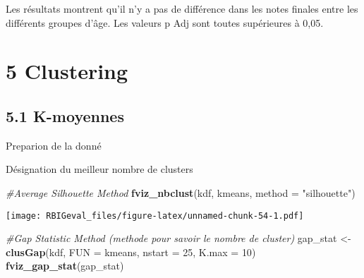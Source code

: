 \documentclass[
]{article}
\newenvironment{Shaded}{\begin{snugshade}}{\end{snugshade}}
\newcommand{\CommentTok}[1]{\textcolor[rgb]{0.56,0.35,0.01}{\textit{#1}}}
\newcommand{\DataTypeTok}[1]{\textcolor[rgb]{0.13,0.29,0.53}{#1}}
\newcommand{\DecValTok}[1]{\textcolor[rgb]{0.00,0.00,0.81}{#1}}
\newcommand{\KeywordTok}[1]{\textcolor[rgb]{0.13,0.29,0.53}{\textbf{#1}}}
\newcommand{\NormalTok}[1]{#1}
\newcommand{\OperatorTok}[1]{\textcolor[rgb]{0.81,0.36,0.00}{\textbf{#1}}}
\newcommand{\StringTok}[1]{\textcolor[rgb]{0.31,0.60,0.02}{#1}}
\begin{document}
Les résultats montrent qu'il n'y a pas de différence dans les notes
finales entre les différents groupes d'âge. Les valeurs p Adj sont
toutes supérieures à 0,05.

\hypertarget{clustering}{%
\section{5 Clustering}\label{clustering}}

\hypertarget{k-moyennes}{%
\subsection{5.1 K-moyennes}\label{k-moyennes}}

Preparion de la donné

\begin{Shaded}
\end{Shaded}

Désignation du meilleur nombre de clusters

\begin{Shaded}
\begin{Highlighting}[]
\CommentTok{#Average Silhouette Method}
\KeywordTok{fviz_nbclust}\NormalTok{(kdf, kmeans, }\DataTypeTok{method =} \StringTok{"silhouette"}\NormalTok{)}
\end{Highlighting}
\end{Shaded}

\texttt{[image: RBIGeval\_files/figure-latex/unnamed-chunk-54-1.pdf]}

\begin{Shaded}
\begin{Highlighting}[]
\CommentTok{#Gap Statistic Method (methode pour savoir le nombre de cluster)}
\NormalTok{gap_stat <-}\StringTok{ }\KeywordTok{clusGap}\NormalTok{(kdf, }\DataTypeTok{FUN =}\NormalTok{ kmeans, }\DataTypeTok{nstart =} \DecValTok{25}\NormalTok{, }\DataTypeTok{K.max =} \DecValTok{10}\NormalTok{)}
\KeywordTok{fviz_gap_stat}\NormalTok{(gap_stat)}
\end{Highlighting}
\end{Shaded}
\end{document}

